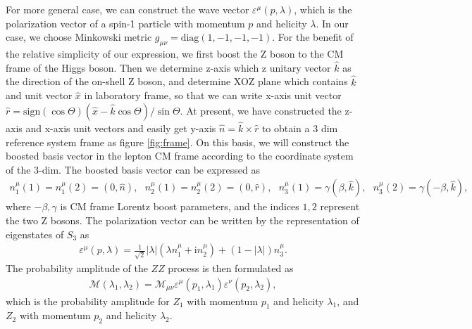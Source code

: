 \documentclass{article}
\begin{document}
For more general case, we can construct the wave vector \(\varepsilon^\mu(p,\lambda)\), which is the polarization vector of a spin-1 particle with momentum \(p\) and helicity \(\lambda\). In our case, we choose Minkowski metric \(g_{\mu\nu}=\mathrm{diag}(1,-1,-1,-1) \). For the benefit of the relative simplicity of our expression, we first boost the Z boson to the CM frame of the Higgs boson. Then we determine z-axis which z unitary vector \(\hat{k}\) as the direction of the on-shell Z boson, and determine XOZ plane which contains \(\hat{k}\) and unit vector \(\hat{x}\) in laboratory frame, so that we can write x-axis unit vector \(\hat{r}=\mathrm{sign}(\cos\Theta)(\hat{x}-\hat{k}\cos\Theta)/\sin\Theta\). At present, we have constructed the z-axis and x-axis unit vectors and easily get y-axis $\hat{n}=\hat{k}\times\hat{r}$ to obtain a 3 dim reference system frame as figure \ref{fig:frame}. On this basis, we will construct the boosted basis vector in the lepton CM frame according to the coordinate system of the 3-dim. The boosted basis vector can be expressed as
\begin{align}
    n_1^\mu(1)=n_1^\mu(2)=(0,\hat{n}), ~~~
    n_2^\mu(1)=n_2^\mu(2)=(0,\hat{r}), ~~~
    n_3^\mu(1)=\gamma(\beta,\hat{k}),~~~
    n_3^\mu(2)=\gamma(-\beta,\hat{k}),
\end{align}
where \(-\beta, \gamma\) is CM frame Lorentz boost parameters, and the indices \(1,2\) represent the two Z bosons. The polarization vector can be written by the representation of eigenstates of \(S_3\) as
\begin{align}
    \varepsilon^\mu(p,\lambda)=\frac{1}{\sqrt{2}}|\lambda|(\lambda n_1^\mu+\mathrm{i}n_2^\mu)+(1-|\lambda|)n_3^\mu.
    \label{eq:polarization}
\end{align} 
The probability amplitude of the \(ZZ\) process is then formulated as
\begin{align}
    \mathcal{M} \left( \lambda _1,\lambda _2 \right) =\mathcal{M} _{\mu \nu}\varepsilon ^{\mu}\left( p_1,\lambda _1 \right) \varepsilon ^{\nu}\left( p_2,\lambda _2 \right),
    \label{eq:amplitude} 
\end{align}
which is the probability amplitude for \(Z_1\) with momentum \(p_1\) and helicity \(\lambda_1\), and \(Z_2\) with momentum \(p_2\) and helicity \(\lambda_2\). 
\end{document}
